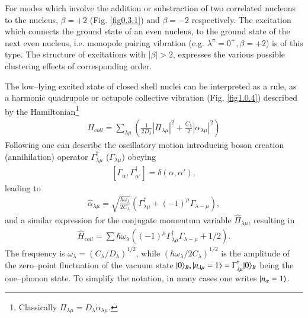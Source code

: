 For modes which involve the addition or substraction of two correlated nucleons to the nucleus, $\beta=+2$ (Fig. \ref{fig0.3.1}) and $\beta=-2$ respectively. The excitation which connects the ground state of an even nucleus, to the ground state of the next even nucleus, i.e. monopole pairing vibration (e.g. $\lambda^\pi=0^+, \beta=+2$) is of this type.
The structure of excitations with $|\beta|>2$, expresses the various possible clustering effects of corresponding order.

The low--lying excited state of closed shell nuclei can be interpreted as a rule, as a harmonic quadrupole or octupole collective vibration (Fig. \ref{fig1.0.4}) described by the Hamiltonian\footnote{Classically $\Pi_{\lambda\mu}=D_\lambda\dot\alpha_{\lambda\mu}$.}
\begin{align}\label{eq1.0.7}
H_{coll}=\sum_{\lambda\mu}\left(\frac{1}{2D_{\lambda}}|\Pi_{\lambda\mu}|^2+\frac{C_\lambda}{2}|\alpha_{\lambda\mu}|^2\right)
\end{align}
Following \cite{Dirac:26} one can describe the oscillatory motion introducing boson creation (annihilation) operator $\Gamma_{\lambda\mu}^\dagger$ ($\Gamma_{\lambda\mu}$) obeying
\begin{align}\label{eq1.0.8}
\left[\Gamma_{\alpha},\Gamma_{\alpha'}^\dagger\right]=\delta(\alpha,\alpha'),
\end{align}
leading to 
\begin{align}\label{eq1.0.9}
\hat\alpha_{\lambda\mu}=\sqrt{\frac{\hbar\omega_\lambda}{2C_\lambda}}\left(\Gamma_{\lambda\mu}^\dagger+(-1)^\mu\Gamma_{\lambda-\mu}\right),
\end{align}
and a similar expression for the conjugate momentum variable $\hat\Pi_{\lambda\mu}$, resulting in 
\begin{align}\label{eq1.0.9b}
\hat H_{coll}=\sum\hbar\omega_\lambda\left((-1)^\mu\Gamma_{\lambda\mu}^\dagger\Gamma_{\lambda-\mu}+1/2\right).
\end{align}
The frequency is $\omega_\lambda=(C_\lambda/D_\lambda)^{1/2}$, while $(\hbar\omega_\lambda/2C_\lambda)^{1/2}$ is the amplitude of the zero--point fluctuation of the vacuum state $|{0} \rangle_B,|{n_{\lambda\mu}=1} \rangle=\Gamma_{\lambda\mu}^\dagger |{0} \rangle_B$ being the one--phonon state. To simplify the notation, in many cases one writes $|{n_\alpha=1} \rangle$.
